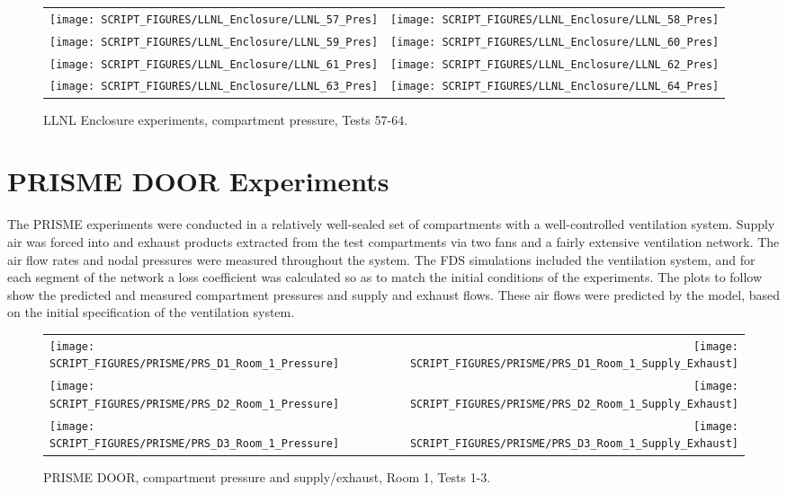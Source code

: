 \begin{figure}[p]
\begin{tabular*}{\textwidth}{l@{\extracolsep{\fill}}r}
\texttt{[image: SCRIPT\_FIGURES/LLNL\_Enclosure/LLNL\_57\_Pres]} &
\texttt{[image: SCRIPT\_FIGURES/LLNL\_Enclosure/LLNL\_58\_Pres]} \\
\texttt{[image: SCRIPT\_FIGURES/LLNL\_Enclosure/LLNL\_59\_Pres]} &
\texttt{[image: SCRIPT\_FIGURES/LLNL\_Enclosure/LLNL\_60\_Pres]} \\
\texttt{[image: SCRIPT\_FIGURES/LLNL\_Enclosure/LLNL\_61\_Pres]} &
\texttt{[image: SCRIPT\_FIGURES/LLNL\_Enclosure/LLNL\_62\_Pres]} \\
\texttt{[image: SCRIPT\_FIGURES/LLNL\_Enclosure/LLNL\_63\_Pres]} &
\texttt{[image: SCRIPT\_FIGURES/LLNL\_Enclosure/LLNL\_64\_Pres]}
\end{tabular*}
\caption{LLNL Enclosure experiments, compartment pressure, Tests 57-64.}
\label{LLNL_Enclosure_Pres_8}
\end{figure}



\clearpage

\section{PRISME DOOR Experiments}

The PRISME experiments were conducted in a relatively well-sealed set of compartments with a well-controlled ventilation system. Supply air was forced into and exhaust products extracted from the test compartments via two fans and a fairly extensive ventilation network. The air flow rates and nodal pressures were measured throughout the system. The FDS simulations included the ventilation system, and for each segment of the network a loss coefficient was calculated so as to match the initial conditions of the experiments. The plots to follow show the predicted and measured compartment pressures and supply and exhaust flows. These air flows were predicted by the model, based on the initial specification of the ventilation system.

\newpage

\begin{figure}[p]
\begin{tabular*}{\textwidth}{l@{\extracolsep{\fill}}r}
\texttt{[image: SCRIPT\_FIGURES/PRISME/PRS\_D1\_Room\_1\_Pressure]} &
\texttt{[image: SCRIPT\_FIGURES/PRISME/PRS\_D1\_Room\_1\_Supply\_Exhaust]} \\
\texttt{[image: SCRIPT\_FIGURES/PRISME/PRS\_D2\_Room\_1\_Pressure]} &
\texttt{[image: SCRIPT\_FIGURES/PRISME/PRS\_D2\_Room\_1\_Supply\_Exhaust]} \\
\texttt{[image: SCRIPT\_FIGURES/PRISME/PRS\_D3\_Room\_1\_Pressure]} &
\texttt{[image: SCRIPT\_FIGURES/PRISME/PRS\_D3\_Room\_1\_Supply\_Exhaust]}
\end{tabular*}
\caption{PRISME DOOR, compartment pressure and supply/exhaust, Room 1, Tests 1-3.}
\label{PRISME_Room_1_Pressure_1-3}
\end{figure}

